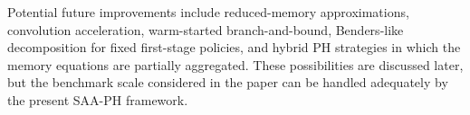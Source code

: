 Potential future improvements include reduced-memory approximations, convolution acceleration, warm-started branch-and-bound, Benders-like decomposition for fixed first-stage policies, and hybrid PH strategies in which the memory equations are partially aggregated. These possibilities are discussed later, but the benchmark scale considered in the paper can be handled adequately by the present SAA-PH framework.

